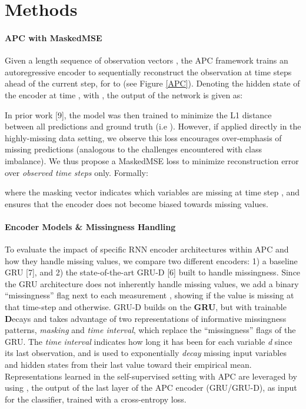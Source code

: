 \documentclass{article}
\begin{document}
\section{Methods}
\paragraph{APC with MaskedMSE}



Given a length  sequence  of observation vectors , the APC framework trains an autoregressive encoder  to sequentially reconstruct the observation at  time steps ahead of the current step, for  to  (see Figure \ref{APC}). Denoting  the hidden state of the encoder at time , with , the output of the network  is given as:
 
In prior work [9],
the model was then trained to minimize the L1 distance between all predictions and ground truth (i.e ). However, if applied directly in the highly-missing data setting, we observe this loss encourages over-emphasis of missing predictions (analogous to the challenges encountered with class imbalance).
We thus propose a MaskedMSE loss to minimize reconstruction error over \emph{observed time steps} only. Formally:
 
\noindent where
the masking vector  indicates which variables are missing at time step , and ensures that the encoder does not become biased towards missing values. 


\paragraph{Encoder Models \& Missingness Handling}
To evaluate the impact of specific RNN encoder architectures within APC and how they handle missing values, we
compare two different encoders: 1) a baseline GRU
[7], 
and 2) the state-of-the-art GRU-D [6]
built to handle missingness. Since the GRU architecture does not inherently handle missing values, we add a binary ``missingness'' flag next to each measurement , showing  if the value is missing at that time-step and  otherwise. 
GRU-D builds on the \textbf{GRU}, but with trainable \textbf{D}ecays and takes advantage of two representations of informative missingness patterns, \textit{masking} and \textit{time interval}, which replace the ``missingness'' flags of the GRU.
The \textit{time interval}  indicates how long it has been for each variable \textit{d} since its last observation, and is used to exponentially \textit{decay} missing input variables and hidden states from their last value toward their empirical mean.
Representations learned in the self-supervised setting with APC are leveraged by using , the output of the last layer of the APC encoder (GRU/GRU-D), as input for the classifier, trained with a cross-entropy loss.
\end{document}
